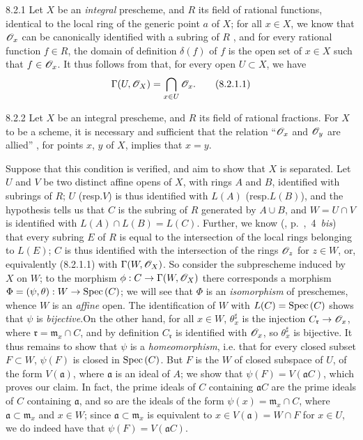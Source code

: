 \begin{env}{8.2.1}
\label{env-1.8.2.1}
Let $X$ be an \emph{integral} prescheme, and $R$ its field of
rational functions, identical to the local ring of the generic point $a$ of $X$;
for all $x\in X$, we know that $\mathscr{O}_x$ can be canonically identified with a
subring of $R$ , and for every rational function $f\in R$, the
domain of definition $\delta(f)$ of $f$ is the open set of $x\in X$ such that
$f\in\mathscr{O}_x$. It thus follows from  that, for every open $U\subset X$,
we have
\[
  \Gamma(U,\mathscr{O}_X)=\bigcap_{x\in U}\mathscr{O}_x.
  \tag{8.2.1.1}
\]
\end{env}

\begin{envs}[Proposition]{8.2.2}
\label{prop-1.8.2.2}
Let $X$ be an integral prescheme,
and $R$ its field of rational fractions. For $X$ to be a scheme, it is
necessary and sufficient that the relation ``$\mathscr{O}_x$ and $\mathscr{O}_y$ are allied''
, for points $x$, $y$ of $X$, implies that $x=y$.
\end{envs}

Suppose that this condition is verified, and aim to show that $X$ is separated.
Let $U$ and $V$ be two distinct affine opens of $X$, with rings $A$ and $B$,
identified with subrings of $R$; $U$ (resp.$V$) is thus identified 
with $L(A)$ (resp.$L(B)$), and the hypothesis tells us  that $C$ is
the subring of $R$ generated by $A\cup B$, and $W=U\cap V$ is identified with
$L(A)\cap L(B)=L(C)$. Further, we know
(\cite{1}, p.~,~4~\emph{bis}) that every subring $E$ of $R$ is
equal to the intersection of the local rings belonging to $L(E)$; $C$ is thus
identified with the intersection of the rings $\mathscr{O}_z$ for $z\in W$, or,
equivalently (8.2.1.1) with $\Gamma(W,\mathscr{O}_X)$. So consider the subprescheme
induced by $X$ on $W$; to the  morphism $\phi:
C\to\Gamma(W,\mathscr{O}_X)$ there corresponds  a morphism
$\Phi=(\psi,\theta):W\to{\mathop{\mathrm{Spec}}\nolimits}\,(C)$; we will see that $\Phi$ is an
\emph{isomorphism} of preschemes, whence $W$ is an \emph{affine} open. The
identification of $W$ with $L(C)={\mathop{\mathrm{Spec}}\nolimits}\,(C)$ shows that $\psi$ is
\emph{bijective}.On the other hand, for all $x\in W$, $\theta_x^\sharp$ is the
injection $C_\mathfrak{r}\to\mathscr{O}_x$, where $\mathfrak{r}=\mathfrak{m}_x\cap C$,
and by definition $C_\mathfrak{r}$ is identified with $\mathscr{O}_x$, so $\theta_x^\sharp$
is bijective. It thus remains to show that $\psi$ is a \emph{homeomorphism},
i.e. that for every closed subset $F\subset W$, $\psi(F)$ is closed in
${\mathop{\mathrm{Spec}}\nolimits}\,(C)$. But $F$ is the  $W$ of closed subspace of $U$,
of the form $V(\mathfrak{a})$, where $\mathfrak{a}$ is an ideal of $A$; we show
that $\psi(F)=V(\mathfrak{a}C)$, which proves our claim. In fact, the prime
ideals of $C$ containing $\mathfrak{a}C$ are the prime ideals of $C$ containing
$\mathfrak{a}$, and so are the ideals of the form $\psi(x)=\mathfrak{m}_x\cap
C$, where $\mathfrak{a}\subset\mathfrak{m}_x$ and $x\in W$; since
$\mathfrak{a}\subset\mathfrak{m}_x$ is equivalent to $x\in V(\mathfrak{a})=W\cap
F$ for $x\in U$, we do indeed have that $\psi(F)=V(\mathfrak{a}C)$.

